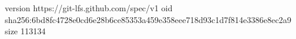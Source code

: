 version https://git-lfs.github.com/spec/v1
oid sha256:6bd8fc4728e0cd6e28b6ce85353a459e358eee718d93c1d7f814e3386e8ec2a9
size 113134
